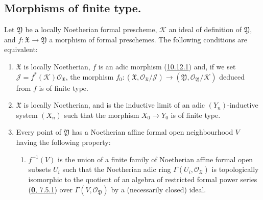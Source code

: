\subsection{Morphisms of finite type.}
\label{subsection:I.10.13}

\begin{proposition}[10.13.1]
\label{I.10.13.1}
Let $\mathfrak{Y}$ be a locally Noetherian formal prescheme,
$\mathscr{K}$ an ideal of definition of $\mathfrak{Y}$, and
$f:\mathfrak{X}\to\mathfrak{Y}$ a morphism of formal preschemes. The
following conditions are equivalent:
\begin{enumerate}
  \item[\textup{a)}] $\mathfrak{X}$ is locally Noetherian, $f$ is an adic morphism
    \textup{(\hyperref[I.10.12.1]{10.12.1})} and, if we set
    $\mathscr{J}=f^*(\mathscr{K})\mathscr{O}_{\mathfrak{X}}$, the morphism
    $f_0:(\mathfrak{X},\mathscr{O}_{\mathfrak{X}}/\mathscr{J})
    \to(\mathfrak{Y},\mathscr{O}_{\mathfrak{Y}}/\mathscr{K})$ deduced from
    $f$ is of finite type.
  \item[\textup{b)}] $\mathfrak{X}$ is locally Noetherian, and is the inductive
    limit of an adic $(Y_n)$-inductive system $(X_n)$ such that the
    morphism $X_0\to Y_0$ is of finite type.


  \item[\textup{c)}] Every point of $\mathfrak{Y}$ has a Noetherian affine formal
    open neighbourhood $V$ having the following property:
    \begin{enumerate}
      \item[\textup{(Q)}] $f^{-1}(V)$ is the union of a finite family
        of Noetherian affine formal open subsets $U_i$ such that the
        Noetherian adic ring $\Gamma(U_i,\mathscr{O}_{\mathfrak{X}})$ is
        topologically isomorphic to the quotient of an algebra of restricted
        formal power series \textup{(\hyperref[0.7.5.1]{\textbf{0}, 7.5.1})} over
        $\Gamma(V,\mathscr{O}_{\mathfrak{Y}})$ by a (necessarily
        closed) ideal.
    \end{enumerate}
\end{enumerate}
\end{proposition}

